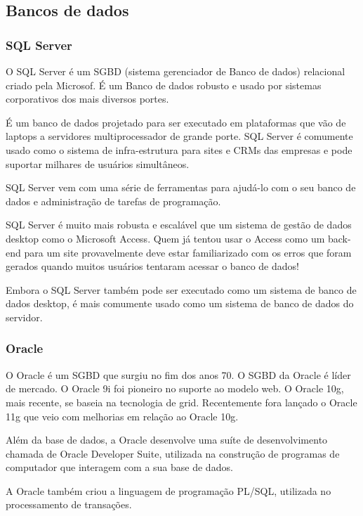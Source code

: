 \subsection{Bancos de dados}
\label{cha:conhecendo}

\subsubsection{SQL Server} 

O SQL Server é um SGBD (sistema gerenciador de Banco de dados) relacional criado pela Microsof. É um Banco de dados robusto e usado por sistemas corporativos dos mais diversos portes.

É um banco de dados projetado para ser executado em plataformas que vão de laptops a servidores multiprocessador de grande porte. SQL Server é comumente usado como o sistema de infra-estrutura para sites e CRMs das empresas e pode suportar milhares de usuários simultâneos.

SQL Server vem com uma série de ferramentas para ajudá-lo com o seu banco de dados e administração de tarefas de programação.

SQL Server é muito mais robusta e escalável que um sistema de gestão de dados desktop como o Microsoft Access. Quem já tentou usar o Access como um back-end para um site provavelmente deve estar familiarizado com os erros que foram gerados quando muitos usuários tentaram acessar o banco de dados!

Embora o SQL Server também pode ser executado como um sistema de banco de dados desktop, é mais comumente usado como um sistema de banco de dados do servidor. \cite{sqlserver}

\subsubsection{Oracle}

O Oracle é um SGBD que surgiu no fim dos anos 70. O SGBD da Oracle é líder de mercado. O Oracle 9i foi pioneiro no suporte ao modelo web. O Oracle 10g, mais recente, se baseia na tecnologia de grid. Recentemente fora lançado o Oracle 11g que veio com melhorias em relação ao Oracle 10g.

Além da base de dados, a Oracle desenvolve uma suíte de desenvolvimento chamada de Oracle Developer Suite, utilizada na construção de programas de computador que interagem com a sua base de dados.

A Oracle também criou a linguagem de programação PL/SQL, utilizada no processamento de transações. \cite{oracle}

